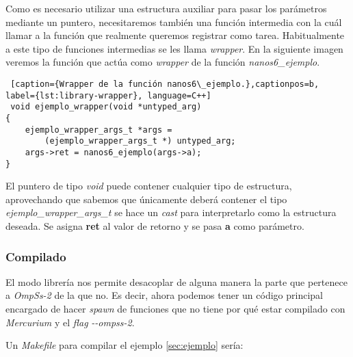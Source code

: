 Como es necesario utilizar una estructura auxiliar para pasar los parámetros mediante un puntero, necesitaremos también una función intermedia con la cuál llamar a la función que realmente queremos registrar como tarea. Habitualmente a este tipo de funciones intermedias se les llama \textit{wrapper}. En la siguiente imagen veremos la función que actúa como \textit{wrapper} de la función \textit{nanos6\_ejemplo}. \smallskip

\begin{lstlisting} [caption={Wrapper de la función nanos6\_ejemplo.},captionpos=b, label={lst:library-wrapper}, language=C++]
 void ejemplo_wrapper(void *untyped_arg)
{
    ejemplo_wrapper_args_t *args = 
        (ejemplo_wrapper_args_t *) untyped_arg;
    args->ret = nanos6_ejemplo(args->a);
}
\end{lstlisting}

El puntero de tipo \textit{void} puede contener cualquier tipo de estructura, aprovechando que sabemos que únicamente deberá contener el tipo \textit{ejemplo\_wrapper\_args\_t} se hace un \textit{cast} para interpretarlo como la estructura deseada. Se asigna \textbf{ret} al valor de retorno y se pasa \textbf{a} como parámetro.

\subsubsection{Compilado}
\label{sec:compilado}

El modo librería nos permite desacoplar de alguna manera la parte que pertenece a \textit{OmpSs-2} de la que no. Es decir, ahora podemos tener un código principal encargado de hacer \textit{spawn} de funciones que no tiene por qué estar compilado con \textit{Mercurium} y el \textit{flag} \textit{-{}-ompss-2}.
\par\bigskip

Un \textit{Makefile} para compilar el ejemplo \ref{sec:ejemplo} sería:
\medskip

